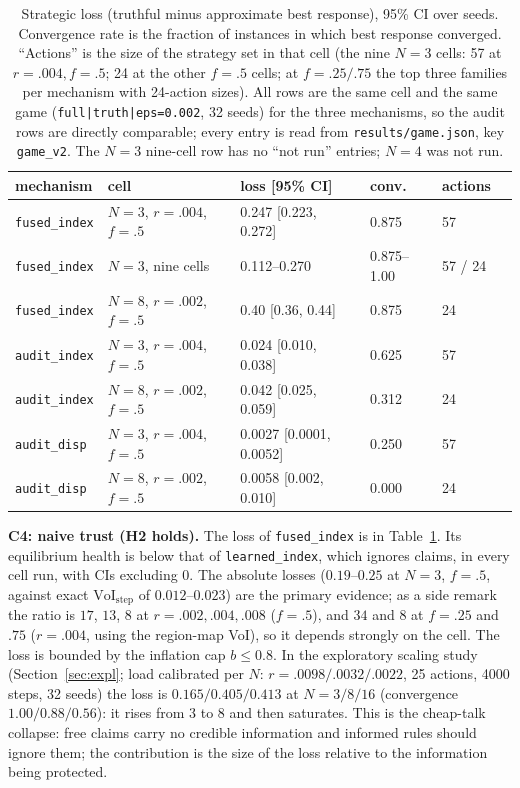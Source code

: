 \documentclass[10pt]{article}
\begin{document}
\begin{table}[t]\centering\small
\caption{Strategic loss (truthful minus approximate best response), 95\% CI over seeds. Convergence rate is the fraction of instances in which best response converged. ``Actions'' is the size of the strategy set in that cell (the nine $N{=}3$ cells: 57 at $r{=}.004,f{=}.5$; 24 at the other $f{=}.5$ cells; at $f{=}.25/.75$ the top three families per mechanism with 24-action sizes). All rows are the same cell and the same game (\texttt{full|truth|eps=0.002}, 32 seeds) for the three mechanisms, so the audit rows are directly comparable; every entry is read from \texttt{results/game.json}, key \texttt{game\_v2}. The $N{=}3$ nine-cell row has no ``not run'' entries; $N{=}4$ was not run.}\label{tab:loss}
\begin{tabular}{llllll}\toprule
mechanism & cell & loss [95\% CI] & conv. & actions\\\midrule
\texttt{fused\_index} & $N{=}3$, $r{=}.004$, $f{=}.5$ & 0.247 [0.223, 0.272] & 0.875 & 57\\
\texttt{fused\_index} & $N{=}3$, nine cells & 0.112--0.270 & 0.875--1.00 & 57 / 24\\
\texttt{fused\_index} & $N{=}8$, $r{=}.002$, $f{=}.5$ & 0.40 [0.36, 0.44] & 0.875 & 24\\
\texttt{audit\_index} & $N{=}3$, $r{=}.004$, $f{=}.5$ & 0.024 [0.010, 0.038] & 0.625 & 57\\
\texttt{audit\_index} & $N{=}8$, $r{=}.002$, $f{=}.5$ & 0.042 [0.025, 0.059] & 0.312 & 24\\
\texttt{audit\_disp} & $N{=}3$, $r{=}.004$, $f{=}.5$ & 0.0027 [0.0001, 0.0052] & 0.250 & 57\\
\texttt{audit\_disp} & $N{=}8$, $r{=}.002$, $f{=}.5$ & 0.0058 [0.002, 0.010] & 0.000 & 24\\\bottomrule
\end{tabular}
\end{table}

\textbf{C4: naive trust (H2 holds).} The loss of \texttt{fused\_index} is in Table~\ref{tab:loss}. Its equilibrium health is below that of \texttt{learned\_index}, which ignores claims, in every cell run, with CIs excluding $0$. The absolute losses ($0.19$--$0.25$ at $N{=}3$, $f{=}.5$, against exact $\mathrm{VoI}_{\text{step}}$ of $0.012$--$0.023$) are the primary evidence; as a side remark the ratio is $17$, $13$, $8$ at $r{=}.002,.004,.008$ ($f{=}.5$), and $34$ and $8$ at $f{=}.25$ and $.75$ ($r{=}.004$, using the region-map VoI), so it depends strongly on the cell. The loss is bounded by the inflation cap $b\le0.8$. In the exploratory scaling study (Section~\ref{sec:expl}; load calibrated per $N$: $r=.0098/.0032/.0022$, 25 actions, 4000 steps, 32 seeds) the loss is $0.165/0.405/0.413$ at $N=3/8/16$ (convergence $1.00/0.88/0.56$): it rises from 3 to 8 and then saturates. This is the cheap-talk collapse: free claims carry no credible information and informed rules should ignore them; the contribution is the size of the loss relative to the information being protected.
\end{document}
